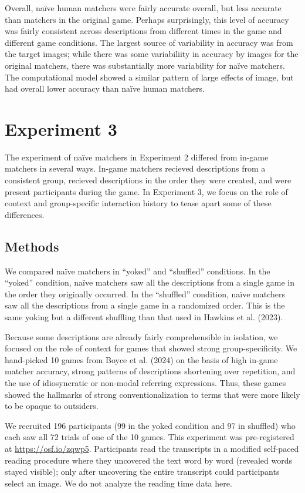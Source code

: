 \documentclass[10pt, letterpaper]{article}
\begin{document}
Overall, naïve human matchers were fairly accurate overall, but less
accurate than matchers in the original game. Perhaps surprisingly, this
level of accuracy was fairly consistent across descriptions from
different times in the game and different game conditions. The largest
source of variability in accuracy was from the target images; while
there was some variabiliity in accuracy by images for the original
matchers, there was substantially more variability for naïve matchers.
The computational model showed a similar pattern of large effects of
image, but had overall lower accuracy than naïve human matchers.

\section{Experiment 3}\label{experiment-3}

The experiment of naïve matchers in Experiment 2 differed from in-game
matchers in several ways. In-game matchers recieved descriptions from a
consistent group, recieved descriptions in the order they were created,
and were present participants during the game. In Experiment 3, we focus
on the role of context and group-specific interaction history to tease
apart some of these differences.

\subsection{Methods}\label{methods-2}

We compared naïve matchers in ``yoked'' and ``shuffled'' conditions. In
the ``yoked'' condition, naïve matchers saw all the descriptions from a
single game in the order they originally occurred. In the ``shuffled''
condition, naïve matchers saw all the descriptions from a single game in
a randomized order. This is the same yoking but a different shuffling
than that used in Hawkins et al. (2023).

Because some descriptions are already fairly comprehensible in
isolation, we focused on the role of context for games that showed
strong group-specificity. We hand-picked 10 games from Boyce et al.
(2024) on the basis of high in-game matcher accuracy, strong patterns of
descriptions shortening over repetition, and the use of idiosyncratic or
non-modal referring expressions. Thus, these games showed the hallmarks
of strong conventionalization to terms that were more likely to be
opaque to outsiders.

We recruited 196 participants (99 in the yoked condition and 97 in
shuffled) who each saw all 72 trials of one of the 10 games. This
experiment was pre-registered at \url{https://osf.io/zqwp5}.
Participants read the transcripts in a modified self-paced reading
procedure where they uncovered the text word by word (revealed words
stayed visible); only after uncovering the entire transcript could
participants select an image. We do not analyze the reading time data
here.
\end{document}
